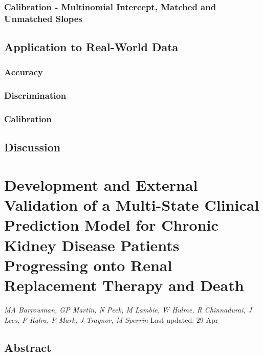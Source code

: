 \documentclass[12pt,PhD,twoside,openright]{muthesis}
\begin{document}
\hypertarget{calibration---multinomial-intercept-matched-and-unmatched-slopes}{%
\subsection{Calibration - Multinomial Intercept, Matched and Unmatched Slopes}\label{calibration---multinomial-intercept-matched-and-unmatched-slopes}}

\hypertarget{application-to-real-world-data}{%
\section{Application to Real-World Data}\label{application-to-real-world-data}}

\hypertarget{accuracy}{%
\subsection{Accuracy}\label{accuracy}}

\hypertarget{discrimination}{%
\subsection{Discrimination}\label{discrimination}}

\hypertarget{calibration}{%
\subsection{Calibration}\label{calibration}}

\hypertarget{discussion-3}{%
\section{Discussion}\label{discussion-3}}

\hypertarget{chap-dev-paper}{%
\chapter{Development and External Validation of a Multi-State Clinical Prediction Model for Chronic Kidney Disease Patients Progressing onto Renal Replacement Therapy and Death}\label{chap-dev-paper}}

\emph{MA Barrowman, GP Martin, N Peek, M Lambie, W Hulme, R Chinnadurai, J Lees, P Kalra, P Mark, J Traynor, M Sperrin}
Last updated: 29 Apr

\hypertarget{abstract-2}{%
\section*{Abstract}\label{abstract-2}}
\end{document}
